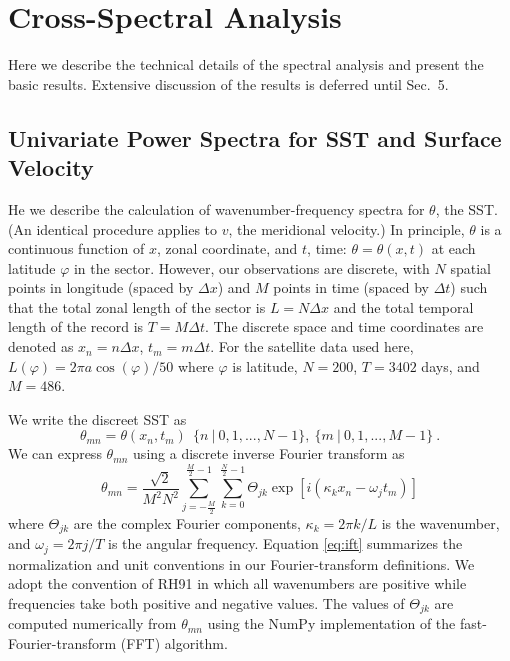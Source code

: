 \documentclass[10pt]{article}
\begin{document}
\section{Cross-Spectral Analysis}

Here we describe the technical details of the spectral analysis and present the basic results. Extensive discussion of the results is deferred until Sec.~5.

\subsection{Univariate Power Spectra for SST and Surface Velocity}

He we describe the calculation of wavenumber-frequency spectra for $\theta$, the SST. (An identical procedure applies to $v$, the meridional velocity.) In principle, $\theta$ is a continuous function of $x$, zonal coordinate, and $t$, time: $\theta = \theta(x,t)$ at each latitude $\varphi$ in the sector. However, our observations are discrete, with $N$ spatial points in longitude (spaced by $\Delta x$) and $M$ points in time (spaced by $\Delta t$) such that the total zonal length of the sector is $L = N \Delta x$ and the total temporal length of the record is $T = M \Delta t$. The discrete space and time coordinates are denoted as $x_n = n \Delta x$, $t_m = m \Delta t$. For the satellite data used here, $L(\varphi) = 2 \pi a \cos(\varphi) / 50$ where $\varphi$ is latitude, $N = 200$, $T = 3402$ days, and $M = 486$.

We write the discreet SST as
\begin{equation}
\theta_{mn} = \theta( x_n, t_m ) \ \ \{n\ |\ 0,1, ..., N-1\} ,\ \{m\ |\ 0,1, ..., M-1\} \ .
\end{equation}
We can express $\theta_{mn}$ using a discrete inverse Fourier transform as
\begin{equation}
\theta_{mn} = \frac{\sqrt{2}}{M^2 N^2} \sum_{j=-\frac{M}{2}}^{\frac{M}{2}-1} \sum_{k=0}^{\frac{N}{2}-1} \Theta_{jk} \exp[ i (\kappa_k x_n - \omega_j t_m ) ] 
\label{eq:ift}
\end{equation}
where $\Theta_{jk}$ are the complex Fourier components, $\kappa_k = 2 \pi k / L$ is the wavenumber, and $\omega_j = 2 \pi j / T$ is the   angular frequency. %
Equation \eqref{eq:ift} summarizes the normalization and unit conventions in our Fourier-transform definitions.
We adopt the convention of RH91 in which all wavenumbers are positive while frequencies take both positive and negative values. The values of $\Theta_{jk}$ are computed numerically from $\theta_{mn}$ using the NumPy implementation of the fast-Fourier-transform (FFT) algorithm. 
\end{document}
